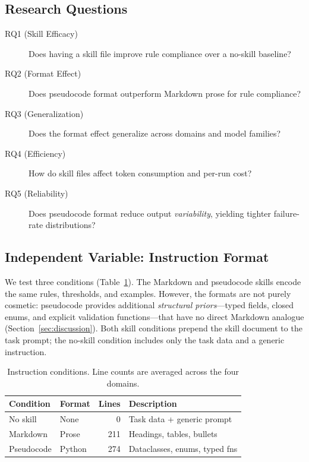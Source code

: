 \documentclass[sigconf,nonacm]{acmart}
\begin{document}
\subsection{Research Questions}\label{sec:rqs}

\begin{description}
  \item[RQ1 (Skill Efficacy)] Does having a skill file improve rule compliance
    over a no-skill baseline?
  \item[RQ2 (Format Effect)] Does pseudocode format outperform Markdown prose
    for rule compliance?
  \item[RQ3 (Generalization)] Does the format effect generalize across domains
    and model families?
  \item[RQ4 (Efficiency)] How do skill files affect token consumption and
    per-run cost?
  \item[RQ5 (Reliability)] Does pseudocode format reduce output
    \emph{variability}, yielding tighter failure-rate distributions?
\end{description}

\subsection{Independent Variable: Instruction Format}\label{sec:iv}

We test three conditions (Table~\ref{tab:conditions}). The Markdown and
pseudocode skills encode the same rules, thresholds, and examples. However,
the formats are not purely cosmetic: pseudocode provides additional
\emph{structural priors}---typed fields, closed enums, and explicit
validation functions---that have no direct Markdown analogue
(Section~\ref{sec:discussion}). Both skill conditions prepend the skill
document to the task prompt; the no-skill condition includes only the task
data and a generic instruction.

\begin{table}[t]
\caption{Instruction conditions. Line counts are averaged across the four
domains.}
\label{tab:conditions}
\centering\small
\begin{tabular}{llrl}
\toprule
\textbf{Condition} & \textbf{Format} & \textbf{Lines} & \textbf{Description} \\
\midrule
No skill & None & 0 & Task data + generic prompt \\
Markdown & Prose & 211 & Headings, tables, bullets \\
Pseudocode & Python & 274 & Dataclasses, enums, typed fns \\
\bottomrule
\end{tabular}
\end{table}
\end{document}
